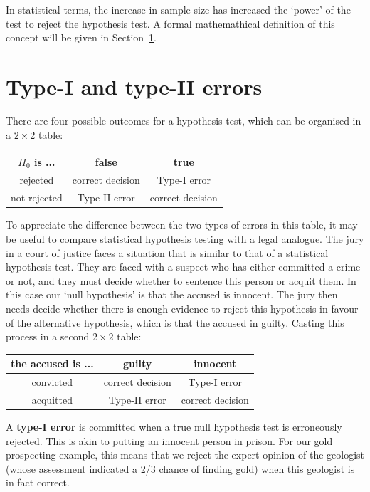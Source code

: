 In statistical terms, the increase in sample size has increased the
`power' of the test to reject the hypothesis test. A formal
mathemathical definition of this concept will be given in
Section~\ref{sec:typeI&II}.

\section{Type-I and type-II errors}
\label{sec:typeI&II}

There are four possible outcomes for a hypothesis test, which can be
organised in a ${2}\times{2}$ table:

\begin{center}
\begin{tabular}{c|cc}
  $H_0$ is ... & false & true \\ \hline
  rejected & correct decision & Type-I error \\
  not rejected & Type-II error & correct decision
\end{tabular}
\end{center}

To appreciate the difference between the two types of errors in this
table, it may be useful to compare statistical hypothesis testing with
a legal analogue. The jury in a court of justice faces a situation
that is similar to that of a statistical hypothesis test. They are
faced with a suspect who has either committed a crime or not, and they
must decide whether to sentence this person or acquit them.  In this
case our `null hypothesis' is that the accused is innocent.  The jury
then needs decide whether there is enough evidence to reject this
hypothesis in favour of the alternative hypothesis, which is that the
accused in guilty. Casting this process in a second ${2}\times{2}$
table:

\begin{center}
\begin{tabular}{c|cc}
  the accused is ... & guilty & innocent \\ \hline
  convicted & correct decision & Type-I error \\
  acquitted & Type-II error & correct decision
\end{tabular}
\end{center}

A \textbf{type-I error} is committed when a true null hypothesis test
is erroneously rejected. This is akin to putting an innocent person in
prison. For our gold prospecting example, this means that we reject
the expert opinion of the geologist (whose assessment indicated a 2/3
chance of finding gold) when this geologist is in fact
correct.\medskip

